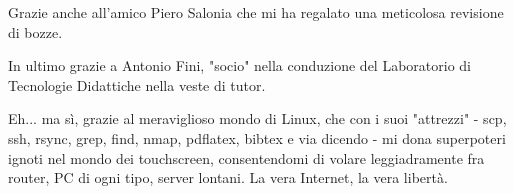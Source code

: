 Grazie anche all'amico Piero Salonia che mi ha regalato una meticolosa revisione di bozze.

In ultimo grazie a Antonio Fini, "socio" nella conduzione del Laboratorio di Tecnologie Didattiche nella veste di tutor.

Eh... ma sì, grazie al meraviglioso mondo di Linux, che con i suoi "attrezzi" - scp, ssh, rsync, grep, find, nmap, pdflatex, bibtex e via dicendo - mi dona superpoteri ignoti nel mondo dei touchscreen, consentendomi di volare leggiadramente fra router, PC di ogni tipo, server lontani. La vera Internet, la vera libertà. 
